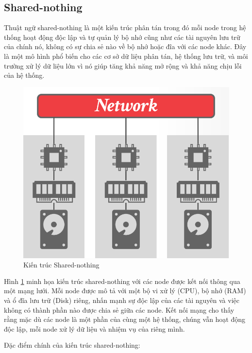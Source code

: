 \documentclass{article}[13pt]
\begin{document}
\subsection{Shared-nothing}

Thuật ngữ shared-nothing \cite{article} là một kiến trúc phân tán trong đó mỗi node trong hệ thống hoạt động độc lập và tự quản lý bộ nhớ cũng như các tài nguyên lưu trữ của chính nó, không có sự chia sẻ nào về bộ nhớ hoặc đĩa với các node khác. Đây là một mô hình phổ biến cho các cơ sở dữ liệu phân tán, hệ thống lưu trữ, và môi trường xử lý dữ liệu lớn vì nó giúp tăng khả năng mở rộng và khả năng chịu lỗi của hệ thống.

\begin{figure}
    \centering
    \includegraphics[width=1\linewidth]{ShareNothingAr.png}
    \caption{Kiến trúc Shared-nothing}
    \label{fig:ShareNothingAr}
\end{figure}

Hình \ref{fig:ShareNothingAr} minh họa kiến trúc shared-nothing với các node được kết nối thông qua một mạng lưới. Mỗi node được mô tả với một bộ vi xử lý (CPU), bộ nhớ (RAM) và ổ đĩa lưu trữ (Disk) riêng, nhấn mạnh sự độc lập của các tài nguyên và việc không có thành phần nào được chia sẻ giữa các node. Kết nối mạng cho thấy rằng mặc dù các node là một phần của cùng một hệ thống, chúng vẫn hoạt động độc lập, mỗi node xử lý dữ liệu và nhiệm vụ của riêng mình.

Đặc điểm chính của kiến trúc shared-nothing:
\end{document}

